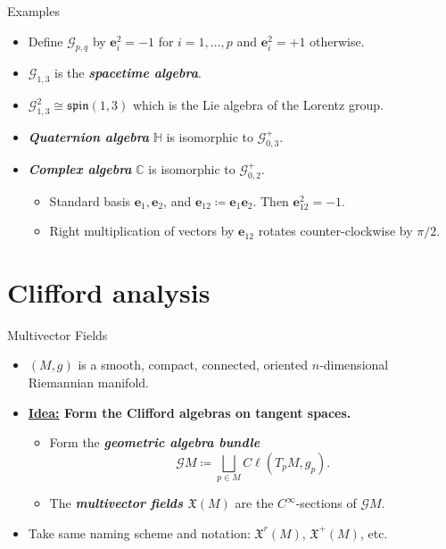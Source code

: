 \documentclass[aspectratio=169,handout]{beamer}
\newcommand\boldgreen[1]{\textcolor{lighter_csu_green}{\emph{\textbf{#1}}}}
\newcommand\boldgold[1]{\textcolor{csu_gold}{\textbf{#1}}}
\newcommand{\C}{\mathbb{C}}
\newcommand{\G}{\mathcal{G}}
\newcommand{\blade}[1]{\boldsymbol{#1}}
\newcommand{\smoothfields}{\mathfrak{X}}
\begin{document}
\begin{frame}{Examples}
\vfill
\begin{itemize}
\pause
\item Define $\G_{p,q}$ by $\blade{e}_i^2=-1$ for $i=1,\dots,p$ and $\blade{e}_i^2=+1$ otherwise.
\pause
\item \boldgold{$\G_{1,3}$} is the \boldgreen{spacetime algebra}.
\pause
\item $\G_{1,3}^2 \cong \mathfrak{spin}(1,3)$ which is the Lie algebra of the Lorentz group.
\pause
\item \boldgreen{Quaternion algebra} \boldgold{$\mathbb{H}$} is isomorphic to $\G_{0,3}^+$.
\pause
\item \boldgreen{Complex algebra}  \boldgold{$\C$} is isomorphic to $\G_{0,2}^+$.
\begin{itemize}
\pause
\item Standard basis $\blade{e}_1,\blade{e}_2$, and $\blade{e}_{12}\coloneqq \blade{e}_1\blade{e}_2$. Then $\blade{e}_{12}^2 = -1$.
\pause
\item Right multiplication of vectors by $\blade{e}_{12}$ rotates counter-clockwise by $\pi/2$.
\end{itemize}
\end{itemize}
\vfill
\end{frame}

\section{Clifford analysis}

\begin{frame}{Multivector Fields}
\vfill
\begin{itemize}
\pause
\item $(M,g)$ is a smooth, compact, connected, oriented $n$-dimensional Riemannian manifold.
\pause
\item \noindent\boldgold{{\underline{Idea:}} Form the Clifford algebras on tangent spaces.}
    \begin{itemize}
        \pause
        \item Form the \boldgreen{geometric algebra bundle}
        \[
        \G M \coloneqq \bigsqcup_{p\in M} C\ell(T_pM,g_p).
        \]
        \pause
        \item The \boldgreen{multivector fields $\smoothfields(M)$} are the $C^\infty$-sections of $\G M$.
    \end{itemize}
    \pause
    \item Take same naming scheme and notation: $\smoothfields^r(M)$, $\smoothfields^+(M)$, etc.
\end{itemize}
\vfill
\end{frame}
\end{document}
